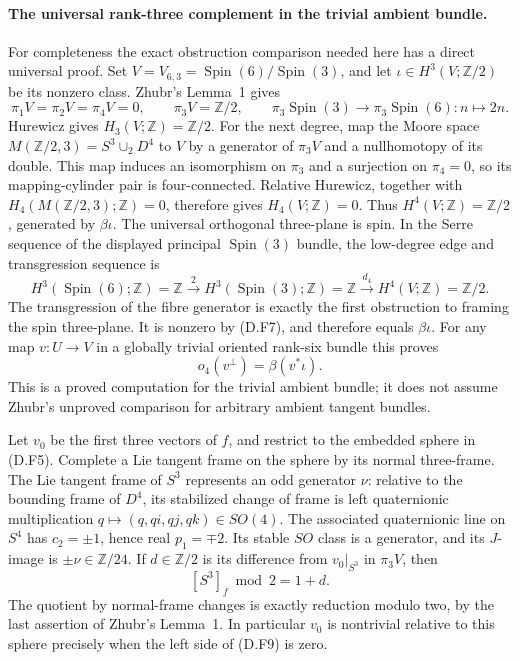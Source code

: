 \paragraph{The universal rank-three complement in the trivial ambient bundle.}
For completeness the exact obstruction comparison needed here
has a direct universal proof.  Set
$V=V_{6,3}=\operatorname{Spin}(6)/\operatorname{Spin}(3)$,
and let $\iota\in H^3(V;\mathbb Z/2)$ be its nonzero class.
Zhubr's Lemma~1 gives
\[
 \pi_1V=\pi_2V=\pi_4V=0,\qquad \pi_3V=\mathbb Z/2,
 \qquad
 \pi_3\operatorname{Spin}(3)\longrightarrow
 \pi_3\operatorname{Spin}(6): n\longmapsto2n.
\]
Hurewicz gives $H_3(V;\mathbb Z)=\mathbb Z/2$.
For the next degree, map the Moore space
$M(\mathbb Z/2,3)=S^3\cup_2D^4$ to $V$ by a generator of
$\pi_3V$ and a nullhomotopy of its double.  This map induces
an isomorphism on $\pi_3$ and a surjection on $\pi_4=0$,
so its mapping-cylinder pair is four-connected.  Relative
Hurewicz, together with $H_4(M(\mathbb Z/2,3);\mathbb Z)=0$,
therefore gives $H_4(V;\mathbb Z)=0$.
Thus $H^4(V;\mathbb Z)=\mathbb Z/2$, generated by $\beta\iota$.
The universal orthogonal three-plane is spin.  In the Serre
sequence of the displayed principal $\operatorname{Spin}(3)$
bundle, the low-degree edge and transgression sequence is
\[
 H^3(\operatorname{Spin}(6);\mathbb Z)=\mathbb Z
 \xrightarrow{\,2\,}
 H^3(\operatorname{Spin}(3);\mathbb Z)=\mathbb Z
 \xrightarrow{d_4}H^4(V;\mathbb Z)=\mathbb Z/2.
 \tag{D.F7}
\]
The transgression of the fibre generator is exactly the first
obstruction to framing the spin three-plane.  It is nonzero by
(D.F7), and therefore equals $\beta\iota$.
For any map $v:U\to V$ in a globally trivial oriented rank-six
bundle this proves
\[
                         o_4(v^\perp)=\beta(v^*\iota).
 \tag{D.F8}
\]
This is a proved computation for the trivial ambient bundle; it
does not assume Zhubr's unproved comparison for arbitrary
ambient tangent bundles.

Let $v_0$ be the first three vectors of $f$, and restrict to the
embedded sphere in (D.F5).  Complete a Lie tangent frame on the
sphere by its normal three-frame.  The Lie tangent frame of
$S^3$ represents an odd generator $\nu$: relative to the
bounding frame of $D^4$, its stabilized change of frame is
left quaternionic multiplication
$q\mapsto(q,qi,qj,qk)\in SO(4)$.  The associated quaternionic
line on $S^4$ has $c_2=\pm1$, hence real $p_1=\mp2$.
Its stable $SO$ class is a generator, and its $J$-image is
$\pm\nu\in\mathbb Z/24$.
If $d\in\mathbb Z/2$
is its difference from $v_0|_{S^3}$ in $\pi_3V$, then
\[
                         [S^3]_f\bmod2=1+d.
 \tag{D.F9}
\]
The quotient by normal-frame changes is exactly reduction
modulo two, by the last assertion of Zhubr's Lemma~1.
In particular $v_0$ is nontrivial relative to this sphere
precisely when the left side of (D.F9) is zero.

